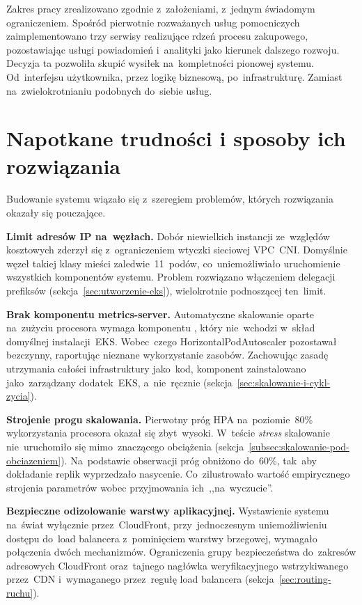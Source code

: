 Zakres pracy zrealizowano zgodnie z~założeniami, z~jednym świadomym ograniczeniem. Spośród pierwotnie rozważanych
usług pomocniczych zaimplementowano trzy serwisy realizujące rdzeń procesu zakupowego, pozostawiając usługi
powiadomień i~analityki jako kierunek dalszego rozwoju. Decyzja ta
pozwoliła skupić wysiłek na~kompletności pionowej systemu. Od~interfejsu użytkownika, przez logikę biznesową,
po~infrastrukturę. Zamiast na~zwielokrotnianiu podobnych do~siebie usług.

\section*{Napotkane trudności i sposoby ich rozwiązania}
{}
\label{sec:napotkane-trudnosci}

Budowanie systemu wiązało się z~szeregiem problemów, których rozwiązania okazały się pouczające.

\textbf{Limit adresów IP na~węzłach.} Dobór niewielkich instancji  ze~względów kosztowych
zderzył się z~ograniczeniem wtyczki sieciowej VPC~CNI. Domyślnie węzeł takiej klasy mieści zaledwie~11~podów,
co~uniemożliwiało uruchomienie wszystkich komponentów systemu. Problem rozwiązano włączeniem delegacji prefiksów
(sekcja~\ref{sec:utworzenie-eks}), wielokrotnie podnoszącej ten~limit.

\textbf{Brak komponentu metrics-server.} Automatyczne skalowanie oparte na~zużyciu procesora wymaga komponentu
, który nie~wchodzi w~skład domyślnej instalacji~EKS. Wobec~czego HorizontalPodAutoscaler
pozostawał bezczynny, raportując nieznane wykorzystanie zasobów. Zachowując zasadę utrzymania całości
infrastruktury jako~kod, komponent zainstalowano jako~zarządzany dodatek~EKS, a~nie~ręcznie
(sekcja~\ref{sec:skalowanie-i-cykl-zycia}).

\textbf{Strojenie progu skalowania.} Pierwotny próg HPA na~poziomie~80\% wykorzystania procesora okazał się
zbyt~wysoki. W~teście \emph{stress} skalowanie nie~uruchomiło się mimo~znaczącego obciążenia
(sekcja~\ref{subsec:skalowanie-pod-obciazeniem}). Na~podstawie obserwacji próg obniżono do~60\%, tak~aby
dokładanie replik wyprzedzało nasycenie. Co~zilustrowało wartość empirycznego strojenia parametrów wobec
przyjmowania ich~,,na~wyczucie''.

\textbf{Bezpieczne odizolowanie warstwy aplikacyjnej.} Wystawienie systemu na~świat wyłącznie przez~CloudFront,
przy~jednoczesnym uniemożliwieniu dostępu do~load balancera z~pominięciem warstwy brzegowej, wymagało połączenia
dwóch mechanizmów. Ograniczenia grupy bezpieczeństwa do~zakresów adresowych CloudFront oraz~tajnego nagłówka
weryfikacyjnego wstrzykiwanego przez~CDN i~wymaganego przez~regułę load balancera (sekcja~\ref{sec:routing-ruchu}).

